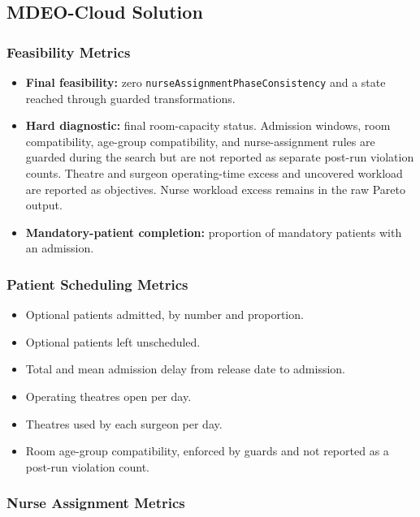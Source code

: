 \documentclass[11pt,a4paper]{article}
\begin{document}
\subsection{MDEO-Cloud Solution}

\subsubsection{Feasibility Metrics}

\begin{itemize}
    \item \textbf{Final feasibility:} zero \texttt{nurseAssignmentPhaseConsistency} and a state reached through guarded transformations.
    \item \textbf{Hard diagnostic:} final room-capacity status. Admission windows, room compatibility, age-group compatibility, and nurse-assignment rules are guarded during the search but are not reported as separate post-run violation counts. Theatre and surgeon operating-time excess and uncovered workload are reported as objectives. Nurse workload excess remains in the raw Pareto output.
    \item \textbf{Mandatory-patient completion:} proportion of mandatory patients with an admission.
\end{itemize}

\subsubsection{Patient Scheduling Metrics}

\begin{itemize}
    \item Optional patients admitted, by number and proportion.
    \item Optional patients left unscheduled.
    \item Total and mean admission delay from release date to admission.
    \item Operating theatres open per day.
    \item Theatres used by each surgeon per day.
    \item Room age-group compatibility, enforced by guards and not reported as a post-run violation count.
\end{itemize}

\subsubsection{Nurse Assignment Metrics}
\end{document}
